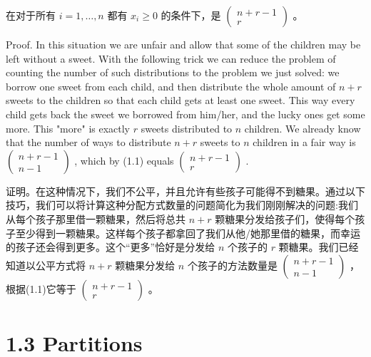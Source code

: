\documentclass[10pt]{article}
\begin{document}
\begin{tcolorbox}\relax
在对于所有 \(i = 1,\ldots ,n\) 都有 \({x}_{i} \geq  0\) 的条件下，是 \(\left( \begin{matrix} n + r - 1 \\  r \end{matrix}\right)\) 。
\end{tcolorbox}

Proof. In this situation we are unfair and allow that some of the children may be left without a sweet. With the following trick we can reduce the problem of counting the number of such distributions to the problem we just solved: we borrow one sweet from each child, and then distribute the whole amount of \(n + r\) sweets to the children so that each child gets at least one sweet. This way every child gets back the sweet we borrowed from him/her, and the lucky ones get some more. This "more" is exactly \(r\) sweets distributed to \(n\) children. We already know that the number of ways to distribute \(n + r\) sweets to \(n\) children in a fair way is \(\left( \begin{matrix} n + r - 1 \\  n - 1 \end{matrix}\right)\) , which by (1.1) equals \(\left( \begin{matrix} n + r - 1 \\  r \end{matrix}\right)\) .

\begin{tcolorbox}\relax
证明。在这种情况下，我们不公平，并且允许有些孩子可能得不到糖果。通过以下技巧，我们可以将计算这种分配方式数量的问题简化为我们刚刚解决的问题:我们从每个孩子那里借一颗糖果，然后将总共 \(n + r\) 颗糖果分发给孩子们，使得每个孩子至少得到一颗糖果。这样每个孩子都拿回了我们从他/她那里借的糖果，而幸运的孩子还会得到更多。这个“更多”恰好是分发给 \(n\) 个孩子的 \(r\) 颗糖果。我们已经知道以公平方式将 \(n + r\) 颗糖果分发给 \(n\) 个孩子的方法数量是 \(\left( \begin{matrix} n + r - 1 \\  n - 1 \end{matrix}\right)\) ，根据(1.1)它等于 \(\left( \begin{matrix} n + r - 1 \\  r \end{matrix}\right)\) 。
\end{tcolorbox}

\section*{1.3 Partitions}
\end{document}

